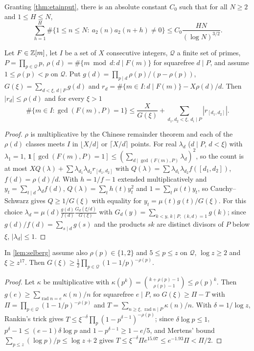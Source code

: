 \documentclass[11pt]{article}
\DeclareMathOperator{\rad}{rad}
\newcommand{\ind}{\mathbf 1}
\newcommand{\cnt}{\#}
\begin{document}
\begin{theorem}\label{thm:S}
Granting \cref{thm:etainput}, there is an absolute constant $C_0$ such that for all $N\ge2$ and
$1\le H\le N$,
\[
\sum_{h=1}^H\cnt\{1\le n\le N:\ a_2(n)a_2(n+h)\ne0\}\le C_0\frac{HN}{(\log N)^{3/2}}.
\]
\end{theorem}

\begin{lemma}\label{lem:selberg}
Let $F\in\mathbb Z[m]$, let $I$ be a set of $X$ consecutive integers, $\mathcal Q$ a finite set of primes,
$P=\prod_{p\in\mathcal Q}p$, $\rho(d)=\cnt\{m\bmod d:d\mid F(m)\}$ for squarefree $d\mid P$, and assume
$1\le\rho(p)<p$ on $\mathcal Q$. Put $g(d)=\prod_{p\mid d}\rho(p)/(p-\rho(p))$,
$G(\xi)=\sum_{d<\xi,\,d\mid P}g(d)$ and $r_d=\cnt\{m\in I:d\mid F(m)\}-X\rho(d)/d$. Then $|r_d|\le\rho(d)$
and for every $\xi>1$
\[
\cnt\{m\in I:\gcd(F(m),P)=1\}\le\frac X{G(\xi)}+\sum_{d_1,d_2<\xi,\ d_i\mid P}|r_{[d_1,d_2]}|.
\]
\end{lemma}

\begin{proof}
$\rho$ is multiplicative by the Chinese remainder theorem and each of the $\rho(d)$ classes meets $I$
in $\lfloor X/d\rfloor$ or $\lceil X/d\rceil$ points. For real $\lambda_d$ ($d\mid P$, $d<\xi$) with
$\lambda_1=1$, $\ind[\gcd(F(m),P)=1]\le(\sum_{d\mid\gcd(F(m),P)}\lambda_d)^2$, so the count is at most
$XQ(\lambda)+\sum\lambda_{d_1}\lambda_{d_2}r_{[d_1,d_2]}$ with
$Q(\lambda)=\sum\lambda_{d_1}\lambda_{d_2}f([d_1,d_2])$, $f(d)=\rho(d)/d$. With $h=1/f-1$ extended
multiplicatively and $y_t=\sum_{t\mid d}\lambda_df(d)$, $Q(\lambda)=\sum_th(t)y_t^2$ and
$1=\sum_t\mu(t)y_t$, so Cauchy--Schwarz gives $Q\ge1/G(\xi)$ with equality for
$y_t=\mu(t)g(t)/G(\xi)$. For this choice
$\lambda_d=\mu(d)\frac{g(d)}{f(d)}\frac{G_d(\xi/d)}{G(\xi)}$ with $G_d(y)=\sum_{k<y,\,k\mid P,\,(k,d)=1}g(k)$;
since $g(d)/f(d)=\sum_{s\mid d}g(s)$ and the products $sk$ are distinct divisors of $P$ below $\xi$,
$|\lambda_d|\le1$.
\end{proof}

\begin{lemma}\label{lem:Glower}
In \cref{lem:selberg} assume also $\rho(p)\in\{1,2\}$ and $5\le p\le z$ on $\mathcal Q$, $\log z\ge2$
and $\xi\ge z^{17}$. Then $G(\xi)\ge\frac12\prod_{p\in\mathcal Q}(1-1/p)^{-\rho(p)}$.
\end{lemma}

\begin{proof}
Let $\kappa$ be multiplicative with $\kappa(p^k)=\binom{k+\rho(p)-1}{\rho(p)-1}\le\rho(p)^k$. Then
$g(e)\ge\sum_{\rad n=e}\kappa(n)/n$ for squarefree $e\mid P$, so $G(\xi)\ge\Pi-T$ with
$\Pi=\prod_{p\in\mathcal Q}(1-1/p)^{-\rho(p)}$ and $T=\sum_{n\ge\xi,\,\rad n\mid P}\kappa(n)/n$. With
$\delta=1/\log z$, Rankin's trick gives $T\le\xi^{-\delta}\prod_p(1-p^{\delta-1})^{-\rho(p)}$; since
$\delta\log p\le1$, $p^\delta-1\le(e-1)\delta\log p$ and $1-p^{\delta-1}\ge1-e/5$, and Mertens'
bound $\sum_{p\le z}(\log p)/p\le\log z+2$ gives $T\le\xi^{-\delta}\Pi e^{15.07}\le e^{-1.93}\Pi<\Pi/2$.
\end{proof}
\end{document}

